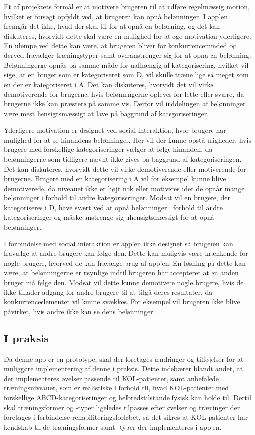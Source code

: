 Et af projektets formål er at motivere brugeren til at udføre regelmæssig motion, hvilket er forsøgt opfyldt ved, at brugeren kan opnå belønninger. I app’en fremgår det ikke, hvad der skal til for at opnå en belønning, og det kan diskuteres, hvorvidt dette skal være en mulighed for at øge motivation yderligere. En ulempe ved dette kan være, at brugeren bliver for konkurrenceminded og derved fravælger træningstyper samt overanstrenger sig for at opnå en belønning. Belønningerne opnås på samme måde for uafhængig af kategorisering, hvilket vil sige, at en bruger som er kategoriseret som D, vil skulle træne lige så meget som en der er kategoriseret i A. Det kan diskuteres, hvorvidt det vil virke demotiverende for brugerne, hvis belønningerne opleves for lette eller svære, da brugerne ikke kan præstere på samme vis. Derfor vil inddelingen af belønninger være mest hensigtsmæssigt at lave på baggrund af kategoriseringer. 

Yderligere motivation er designet ved social interaktion, hvor brugere har mulighed for at se hinandens belønninger. Her vil der kunne opstå uligheder, hvis brugere med forskellige kategoriseringer vælger at følge hinanden, da belønningerne som tidligere nævnt ikke gives på baggrund af kategoriseringen. Det kan diskuteres, hvorvidt dette vil virke demotiverende eller motiverende for brugerne. Brugere med en kategorisering i A vil for eksempel kunne blive demotiverede, da niveauet ikke er højt nok eller motiveres idet de opnår mange belønninger i forhold til andre kategoriseringer. Modsat vil en brugere, der kategoriseres i D, have svært ved at opnå belønninger i forhold til andre kategoriseringer og måske anstrenge sig uhensigtsmæssigt for at opnå belønninger. 

I forbindelse med social interaktion er app’en ikke designet så brugeren kan fravælge at andre brugere kan følge den. Dette kan muligvis være krænkende  for nogle brugere, hvorved de kan fravælge brug af app’en. En løsning på dette kan være, at belønningerne er usynlige indtil brugeren har accepteret at en anden bruger må følge den. Modsat vil dette kunne demotivere nogle brugere, hvis de ikke tillader adgang for andre brugere til at tilgå deres resultater, da konkurrenceelementet vil kunne svækkes. For eksempel vil brugeren ikke blive påvirket, hvis andre ikke kan se dens belønninger.

\subsection{I praksis}
Da denne app er en prototype, skal der foretages ændringer og tilføjelser for at muliggøre implementering af denne i praksis. Dette indebærer blandt andet, at der implementeres øvelser passende til KOL-patienter, samt anbefalede træningsniveauer, som er realistiske i forhold til, hvad KOL-patienter med forskellige ABCD-kategoriseringer og helbredstilstande fysisk kan holde til. Dertil skal træningsformer og -typer ligeledes tilpasses efter øvelser og træninger der foretages i forbindelse rehabiliteringsforløbet, så det sikres at KOL-patienter har kendskab til de træningsformer samt -typer der implementeres i app’en.  